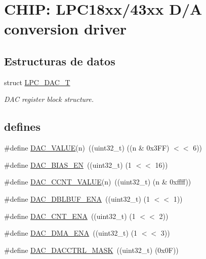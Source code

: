 \hypertarget{group___d_a_c__18_x_x__43_x_x}{}\section{C\+H\+IP\+: L\+P\+C18xx/43xx D/A conversion driver}
\label{group___d_a_c__18_x_x__43_x_x}
\subsection*{Estructuras de datos}
\begin{DoxyCompactItemize}
\item 
struct \hyperlink{struct_l_p_c___d_a_c___t}{L\+P\+C\+\_\+\+D\+A\+C\+\_\+T}
\begin{DoxyCompactList}\small\item\em D\+AC register block structure. \end{DoxyCompactList}\end{DoxyCompactItemize}
\subsection*{\textquotesingle{}defines\textquotesingle{}}
\begin{DoxyCompactItemize}
\item 
\#define \hyperlink{group___d_a_c__18_x_x__43_x_x_gac8d652cef1a35726a91ef3e5b4bad59c}{D\+A\+C\+\_\+\+V\+A\+L\+UE}(n)~((uint32\+\_\+t) ((n \& 0x3\+F\+F) $<$$<$ 6))
\item 
\#define \hyperlink{group___d_a_c__18_x_x__43_x_x_gabdfe0f0d61a206418a2ffdba26653873}{D\+A\+C\+\_\+\+B\+I\+A\+S\+\_\+\+EN}~((uint32\+\_\+t) (1 $<$$<$ 16))
\item 
\#define \hyperlink{group___d_a_c__18_x_x__43_x_x_ga23fecd9fa274c0f8387aad48330a0432}{D\+A\+C\+\_\+\+C\+C\+N\+T\+\_\+\+V\+A\+L\+UE}(n)~((uint32\+\_\+t) (n \& 0xffff))
\item 
\#define \hyperlink{group___d_a_c__18_x_x__43_x_x_gaa52ab08dc967f09afb7fcbb15ef1b1c0}{D\+A\+C\+\_\+\+D\+B\+L\+B\+U\+F\+\_\+\+E\+NA}~((uint32\+\_\+t) (1 $<$$<$ 1))
\item 
\#define \hyperlink{group___d_a_c__18_x_x__43_x_x_gae7c63d487a239e6abaf2bfdced3c67e4}{D\+A\+C\+\_\+\+C\+N\+T\+\_\+\+E\+NA}~((uint32\+\_\+t) (1 $<$$<$ 2))
\item 
\#define \hyperlink{group___d_a_c__18_x_x__43_x_x_gab00cf8cef7eee4ff812d53ae52e4b38d}{D\+A\+C\+\_\+\+D\+M\+A\+\_\+\+E\+NA}~((uint32\+\_\+t) (1 $<$$<$ 3))
\item 
\#define \hyperlink{group___d_a_c__18_x_x__43_x_x_ga3d9ce4bc003bffdea6fb98da402d2318}{D\+A\+C\+\_\+\+D\+A\+C\+C\+T\+R\+L\+\_\+\+M\+A\+SK}~((uint32\+\_\+t) (0x0\+F))
\end{DoxyCompactItemize}
